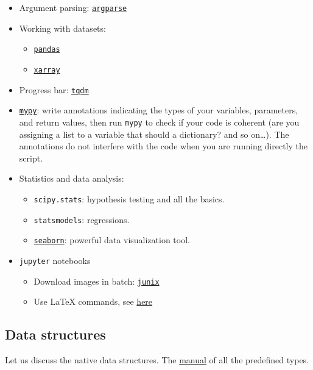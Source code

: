 \documentclass[a4paper,12pt,%
              final%
              ]{article}
\begin{document}
\begin{itemize}
\begin{itemize}
    \end{itemize}
  \item Argument parsing: \href{https://docs.python.org/3/library/argparse.html#module-argparse}{\texttt{argparse}}
  \item Working with datasets:
    \begin{itemize}
      \item \href{https://pandas.pydata.org/docs/user_guide/10min.html}{\texttt{pandas}}
      \item \href{http://xarray.pydata.org/en/stable/user-guide/index.html}{\texttt{xarray}}
    \end{itemize}
  \item Progress bar: \href{https://github.com/tqdm/tqdm#manual}{\texttt{tqdm}}
  \item \href{https://mypy.readthedocs.io/en/stable/index.html}{\texttt{mypy}}: write annotations indicating the types of your variables, parameters, and return values, then run \texttt{mypy} to check if your code is coherent (are you assigning a list to a variable that should a dictionary? and so on\ldots). The annotations do not interfere with the code when you are running directly the script.
  \item Statistics and data analysis:
    \begin{itemize}
      \item \texttt{scipy.stats}: hypothesis testing and all the basics.
      \item \texttt{statsmodels}: regressions.
      \item \href{https://seaborn.pydata.org/introduction.html}{\texttt{seaborn}}: powerful data visualization tool.
    \end{itemize}
  \item \texttt{jupyter} notebooks
    \begin{itemize}
      \item Download images in batch: \href{https://github.com/damienmarlier51/JupyterNotebookImageExporter}{\texttt{junix}}
      \item Use \LaTeX{} commands, see \href{https://stackoverflow.com/questions/13208286/how-to-write-latex-in-ipython-notebook}{here}
      \end{itemize}
\end{itemize}

\subsection{Data structures}
Let us discuss the native data structures. The \href{https://docs.python.org/3/library/stdtypes.html}{manual} of all the predefined types.
\end{document}
